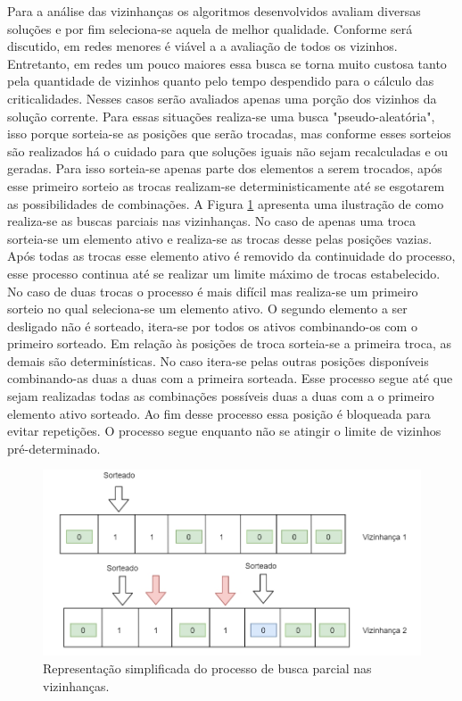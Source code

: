\documentclass[12pt]{article}
\begin{document}
Para a análise das vizinhanças os algoritmos desenvolvidos avaliam diversas soluções e por fim seleciona-se aquela de melhor qualidade. Conforme será discutido, em redes menores é viável a a avaliação de todos os vizinhos. Entretanto, em redes um pouco maiores essa busca se torna muito custosa tanto pela quantidade de vizinhos quanto pelo tempo despendido para o cálculo das criticalidades. Nesses casos serão avaliados apenas uma porção dos vizinhos da solução corrente. Para essas situações realiza-se uma busca "pseudo-aleatória", isso porque sorteia-se as posições que serão trocadas, mas conforme esses sorteios são realizados há o cuidado para que soluções iguais não sejam recalculadas e ou geradas. Para isso sorteia-se apenas parte dos elementos a serem trocados, após esse primeiro sorteio as trocas realizam-se deterministicamente até se esgotarem as possibilidades de combinações. A Figura \ref{fig10} apresenta uma ilustração de como realiza-se as buscas parciais nas vizinhanças. No caso de apenas uma troca sorteia-se um elemento ativo e realiza-se as trocas desse pelas posições vazias. Após todas as trocas esse elemento ativo é removido da continuidade do processo, esse processo continua até se realizar um limite máximo de trocas estabelecido. No caso de duas trocas o processo é mais difícil mas realiza-se um primeiro sorteio no qual seleciona-se um elemento ativo. O segundo elemento a ser desligado não é sorteado, itera-se por todos os ativos combinando-os com o primeiro sorteado. Em relação às posições de troca sorteia-se a primeira troca, as demais são determinísticas. No caso itera-se pelas outras posições disponíveis combinando-as duas a duas com a primeira sorteada. Esse processo segue até que sejam realizadas todas as combinações possíveis duas a duas com a o primeiro elemento ativo sorteado. Ao fim desse processo essa posição é bloqueada para evitar repetições. O processo segue enquanto não se atingir o limite de vizinhos pré-determinado.

\begin{figure}[H]
	\centering 
	\includegraphics[scale=0.6]{figuras/Vizinhancas.jpg}
	\caption{Representação simplificada do processo de busca parcial nas vizinhanças.}
	\label{fig10} %
\end{figure}
\end{document}
